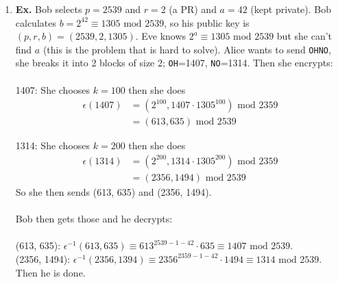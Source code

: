\documentclass[class=article, crop=false]{standalone}
\begin{document}
\begin{enumerate}
	\item \textbf{Ex.}
	Bob selects $p=2539$ and $r=2$ (a PR) and $a=42$ (kept private).
	Bob calculates $b = 2^{42}\equiv 1305\mbox{ mod }2539$, so his public key is
	$(p, r, b)=(2539, 2, 1305)$. Eve knows $2^a\equiv 1305\mbox{ mod }2539$
	but she can't find $a$ (this is the problem that is hard to solve).
	Alice wants to send \verb|OHNO|, she breaks it into 2 blocks of size 2;
	\verb|OH|=1407, \verb|NO|=1314.
	Then she encrypts: \\\\
		1407: She chooses $k=100$ then she does
		\begin{align*}
			\epsilon(1407)&=(2^{100}, 1407\cdot 1305^{100})\mbox{ mod }2359 \\
			&=(613, 635)\mbox{ mod }2539
		\end{align*}
		
		1314: She chooses $k=200$ then she does
		\begin{align*}
			\epsilon(1314)&=(2^{200}, 1314\cdot 1305^{200})\mbox{ mod }2359 \\
			&= (2356, 1494)\mbox{ mod }2539
		\end{align*}
	So she then sends (613, 635) and (2356, 1494). \\\\
	Bob then gets those and he decrypts: \\\\
	(613, 635): $\epsilon^{-1}(613, 635) \equiv 613^{2539-1-42} \cdot 635\equiv 1407\mbox{ mod }2539$. \\
	(2356, 1494): $\epsilon^{-1}(2356, 1394)\equiv 2356^{2359-1-42}\cdot 1494\equiv 1314\mbox{ mod }2539$.
	Then he is done.


\end{enumerate}
\end{document}
